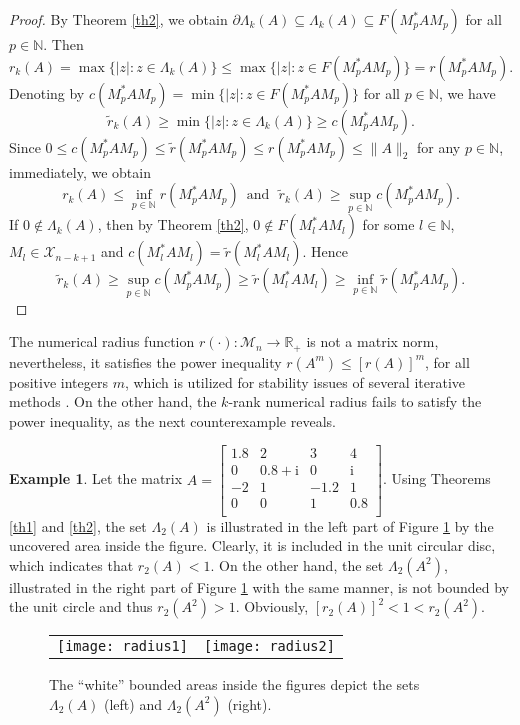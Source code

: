 \documentclass[12pt, reqno]{amsart}
\theoremstyle{definition}
\newtheorem{example}[theorem]{Example}
\theoremstyle{remark}
\numberwithin{equation}{section}
\begin{document}
\begin{proof}
By Theorem \ref{th2}, we obtain $\partial\Lambda_{k}(A)\subseteq\Lambda_{k}(A)\subseteq F(M_{p}^{*}AM_{p})$ for all $p\in\mathbb{N}$. Then
\[
r_{k}(A)=\max\{|z|: z\in\Lambda_{k}(A)\}\leq\max\{|z|: z\in F(M_{p}^{*}AM_{p})\}=r(M_{p}^{*}AM_{p}).
\]
Denoting by $c(M_{p}^{*}AM_{p})=\min\{|z|: z\in F(M_{p}^{*}AM_{p})\}$ for all $p\in\mathbb{N}$, we have
\[
\widetilde{r}_{k}(A)\geq\min\{|z|: z\in\Lambda_{k}(A)\}\geq c(M_{p}^{*}AM_{p}).
\]
Since $0\leq c(M_{p}^{*}AM_{p})\leq\widetilde{r}(M_{p}^{*}AM_{p})\leq r(M_{p}^{*}AM_{p})\leq\|A\|_{2}$ for any $p\in\mathbb{N}$, immediately, we obtain
\begin{equation*}
r_{k}(A)\leq\inf_{p\in\mathbb{N}}r(M_{p}^{*}AM_{p})\,\,\, \textrm{and}\,\,\,\,\widetilde{r}_{k}(A)\geq\sup_{p\in\mathbb{N}}c(M_{p}^{*}AM_{p}).
\end{equation*}
If $0\notin\Lambda_{k}(A)$, then by Theorem \ref{th2}, $0\notin F(M^{*}_{l}AM_{l})$ for some $l\in\mathbb{N}$, $M_{l}\in\mathcal{X}_{n-k+1}$ and $c(M^{*}_{l}AM_{l})=\widetilde{r}(M^{*}_{l}AM_{l})$. Hence
\[
\widetilde{r}_{k}(A)\geq\sup_{p\in\mathbb{N}}c(M^{*}_{p}AM_{p})\geq\widetilde{r}(M^{*}_{l}AM_{l})\geq\inf_{p\in\mathbb{N}}
\widetilde{r}(M^{*}_{p}AM_{p}).
\]
\end{proof}
The numerical radius function $r(\cdot):\mathcal{M}_{n}\to\mathbb{R}_{+}$ is not a matrix norm, never\-theless, it satisfies the power inequality $r(A^{m})\leq[r(A)]^{m}$, for all po\-sitive integers $m$, which is  utilized  for stability issues of several iterative methods \cite{Ando,H.J.T}. On the other hand, the $k$-rank numerical radius fails to satisfy the power inequality, as the next counterexample reveals.
\begin{example}
Let the matrix $A=\left[\begin{smallmatrix}
  1.8 & 2 & 3 & 4 \\
  0 & 0.8+\mathrm{i} & 0 & \mathrm{i} \\
 -2 & 1 & -1.2 & 1 \\
  0 & 0 & 1 & 0.8 \\
\end{smallmatrix}\right]$. Using Theorems \ref{th1} and \ref{th2}, the set $\Lambda_{2}(A)$ is illustrated in the left part of Figure \ref{fig1}  by the uncovered area inside the figure. Clearly, it is included in the unit circular disc, which indicates that $r_{2}(A)<1$. On the other hand, the set $\Lambda_{2}(A^{2})$, illustrated in the right part of  Figure \ref{fig1} with the same manner, is not bounded by the unit circle and thus $r_{2}(A^{2})>1$. Obviously, $[r_{2}(A)]^{2}<1<r_{2}(A^{2})$.\\

\begin{figure}[here]
\begin{tabular}{cc}
 \texttt{[image: radius1]} & \texttt{[image: radius2]} \\
\end{tabular}
\caption{The ``white'' bounded areas inside the figures depict the sets $\Lambda_{2}(A)$ (left) and  $\Lambda_{2}(A^{2})$ (right).}\label{fig1}
\end{figure}
\end{example}
\end{document}
